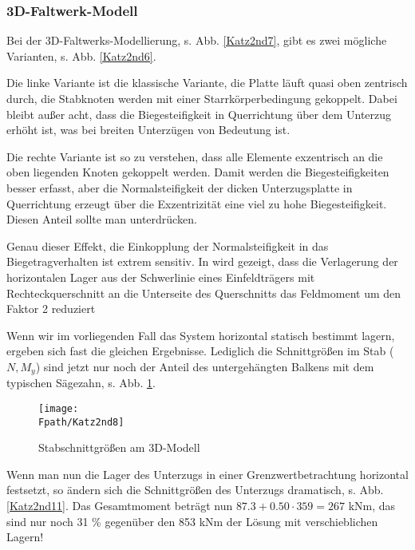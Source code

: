 {\textcolor{sectionTitleBlue}{\subsubsection*{3D-Faltwerk-Modell }}}
Bei der  3D-Faltwerks-Modellierung, s. Abb. \ref{Katz2nd7}, gibt es zwei m\"{o}gliche Varianten, s. Abb. \ref{Katz2nd6}.

Die linke Variante ist die klassische Variante, die Platte l\"{a}uft quasi oben zentrisch durch, die Stabknoten werden mit einer Starrk\"{o}rperbedingung gekoppelt. Dabei bleibt au{\ss}er acht, dass die Biegesteifigkeit in Querrichtung \"{u}ber dem Unterzug erh\"{o}ht ist, was bei breiten Unterz\"{u}gen von Bedeutung ist.

Die rechte Variante ist so zu verstehen, dass alle Elemente exzentrisch an die oben liegenden Knoten gekoppelt werden. Damit werden die Biegesteifigkeiten besser erfasst, aber die Normalsteifigkeit der dicken Unterzugsplatte in Querrichtung erzeugt \"{u}ber die Exzentrizit\"{a}t eine viel zu hohe Biegesteifigkeit. Diesen Anteil sollte man unterdr\"{u}cken.

Genau dieser Effekt, die Einkopplung der Normalsteifigkeit in das Biegetragverhalten ist extrem sensitiv. In \cite{Rombach} wird gezeigt, dass die Verlagerung der horizontalen Lager aus der Schwerlinie eines Einfeldtr\"{a}gers mit Rechteckquerschnitt an die Unterseite des Querschnitts das Feldmoment um den Faktor 2 reduziert

Wenn wir im vorliegenden Fall das System horizontal statisch bestimmt lagern, ergeben sich fast die gleichen Ergebnisse. Lediglich die Schnittgr\"{o}{\ss}en im Stab ($N, M_y$) sind jetzt nur noch der Anteil des untergeh\"{a}ngten Balkens mit dem typischen S\"{a}gezahn, s. Abb. \ref{Katz2nd8}.

\begin{figure}[tbp] \centering
\centering
\if {} \sidecaption[t] \fi
\texttt{[image: \\Fpath/Katz2nd8]}
\caption{Stabschnittgr\"{o}{\ss}en am 3D-Modell } \label{Katz2nd8}
\end{figure}%

Wenn man nun die Lager des Unterzugs in einer Grenzwertbetrachtung horizontal festsetzt, so \"{a}ndern sich die Schnittgr\"{o}{\ss}en des Unterzugs dramatisch, s. Abb. \ref{Katz2nd11}. Das Gesamtmoment betr\"{a}gt nun $87.3+0.50 \cdot 359=267$ kNm, das sind nur noch 31 \%  gegen\"{u}ber den 853 kNm der L\"{o}sung mit verschieblichen Lagern!

